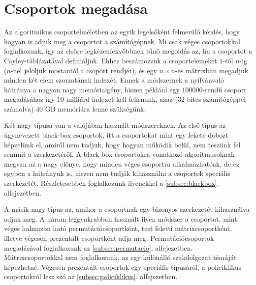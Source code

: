 \section{Csoportok megadása}
\label{sec:csoport}
Az algoritmikus csoportelméletben az egyik legelsőként felmerülő kérdés, hogy hogyan is adjuk meg
a csoportot a számítógépnek.
Mi csak véges csoportokkal foglalkozunk, így az elsőre legkézenfekvőbbnek tűnő megoldás az, ha a
csoportot a Cayley-táblázatával definiáljuk.
Ehhez beszámozzuk a csoportelemeket $1$-től $n$-ig ($n$-nel jelöljük mostantól a csoport rendjét),
és egy $n\times n$-es mátrixban megadjuk minden két elem szorzatának indexét.
Ennek a módszernek a nyílvánvaló hátránya a nagyon nagy memóriaigény,
hiszen például egy $100000$-rendű csoport megadásához így $10$ milliárd indexet kell felírnunk,
azaz (32-bites számítógéppel számolva) 40 GB memóriára lenne szükségünk.

Két nagy típusa van a valójában használt módszereknek.
Az első típus az úgynevezett black-box csoportok, itt a csoportokat mint egy fekete dobozt képzelünk el,
amiről nem tudjuk, hogy hogyan működik belül, nem teszünk fel semmit a szerkezetéről.
A black-box csoportokra vonatkozó algoritmusoknak megvan az a nagy előnye, hogy minden véges csoportra
alkalmazhatóak, de ez egyben a hátrányuk is, hiszen nem tudják kihasználni a csoportok speciális szerkezetét.
Részletesebben foglalkozunk ilyenekkel a \ref{subsec:blackbox}. alfejezetben.

A másik nagy típus az, amikor a csoportnak egy bizonyos szerkezetét kihasználva adjuk meg.
A három leggyakrabban használt ilyen módszer a csoportot, mint véges halmazon ható permutációcsoportként,
test feletti mátrixcsoportként, illetve végesen prezentált csoportként adja meg.
Permutációcsoportok megadásával foglalkozunk az \ref{subsec:permutacio}. alfejezetben.
Mátrixcsoportokkal nem foglalkozunk, az egy különálló szakdolgozat témáját képezhetné.
Végesen prezentált csoportok egy speciális típusáról, a policiklikus csoportokról lesz szó
az \ref{subsec:policiklikus}. alfejezetben.



